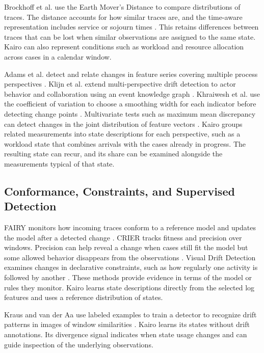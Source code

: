 Brockhoff et al. use the Earth Mover's Distance to compare distributions of traces. The distance accounts for how similar traces are, and the time-aware representation includes service or sojourn times \cite{brockhoff2020time}. This retains differences between traces that can be lost when similar observations are assigned to the same state. Kairo can also represent conditions such as workload and resource allocation across cases in a calendar window.

Adams et al. detect and relate changes in feature series covering multiple process perspectives \cite{adams2023explainable}. Klijn et al. extend multi-perspective drift detection to actor behavior and collaboration using an event knowledge graph \cite{klijn2024multi}. Khraiwesh et al. use the coefficient of variation to choose a smoothing width for each indicator before detecting change points \cite{khraiwesh2027window}. Multivariate tests such as maximum mean discrepancy can detect changes in the joint distribution of feature vectors \cite{gretton2012kernel}. Kairo groups related measurements into state descriptions for each perspective, such as a workload state that combines arrivals with the cases already in progress. The resulting state can recur, and its share can be examined alongside the measurements typical of that state.

\subsection{Conformance, Constraints, and Supervised Detection}

FAIRY monitors how incoming traces conform to a reference model and updates the model after a detected change \cite{pasquadibisceglie2026fairy}. CRIER tracks fitness and precision over windows. Precision can help reveal a change when cases still fit the model but some allowed behavior disappears from the observations \cite{gallego2025crier}. Visual Drift Detection examines changes in declarative constraints, such as how regularly one activity is followed by another \cite{yeshchenko2019visual}. These methods provide evidence in terms of the model or rules they monitor. Kairo learns state descriptions directly from the selected log features and uses a reference distribution of states.

Kraus and van der Aa use labeled examples to train a detector to recognize drift patterns in images of window similarities \cite{kraus2025machine}. Kairo learns its states without drift annotations. Its divergence signal indicates when state usage changes and can guide inspection of the underlying observations.

